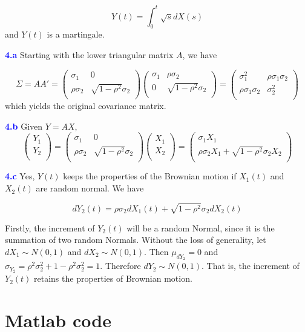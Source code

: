 \documentclass[a4paper,11pt] {article}
\begin{document}
$$
Y(t) = \int_0^t \sqrt{s}dX(s)
$$
and $Y(t)$ is a martingale.

\textcolor{blue}{\bf 4.a } Starting with the lower triangular matrix $A$, we have

$$
\Sigma = AA' =
\left(
  \begin{array}{cc}
    \sigma_1 & 0 \\
    \rho \sigma_2 & \sqrt{1-\rho^2}\sigma_2 \\
  \end{array}
\right)
\left(
  \begin{array}{cc}
    \sigma_1 & \rho \sigma_2 \\
    0 & \sqrt{1-\rho^2}\sigma_2 \\
  \end{array}
\right)
=
\left(
  \begin{array}{cc}
    \sigma_1^2 & \rho \sigma_1 \sigma_2 \\
    \rho \sigma_1 \sigma_2 & \sigma_2^2 \\
  \end{array}
\right)
$$
which yields the original covariance matrix.

\textcolor{blue}{\bf 4.b } Given $Y = AX$,
$$
\left(
  \begin{array}{c}
    Y_1 \\
    Y_2 \\
  \end{array}
\right)
=
\left(
  \begin{array}{cc}
    \sigma_1 & 0 \\
    \rho \sigma_2 & \sqrt{1-\rho^2}\sigma_2 \\
  \end{array}
\right)
\left(
  \begin{array}{c}
    X_1 \\
    X_2 \\
  \end{array}
\right)
=
\left(
  \begin{array}{c}
    \sigma_1 X_1 \\
    \rho \sigma_2 X_1 + \sqrt{1-\rho^2} \sigma_2 X_2 \\
  \end{array}
\right)
$$

\textcolor{blue}{\bf 4.c } Yes, $Y(t)$ keeps the properties of the Brownian motion if $X_1(t)$ and $X_2(t)$ are random normal. We have

$$
dY_2(t) = \rho \sigma_2 dX_1(t) + \sqrt{1-\rho^2} \sigma_2 dX_2(t)
$$

Firstly, the increment of $Y_2(t)$ will be a random Normal, since it is the summation of two random Normals. Without the loss of generality, let $dX_1 \sim N(0,1)$ and $dX_2 \sim N(0,1)$. Then $\mu_{dY_2} = 0$ and $\sigma_{Y_2} = \rho^2\sigma_2^2 + 1 - \rho^2\sigma_2^2 = 1$. Therefore $dY_2 \sim N(0,1)$. That is, the increment of $Y_2(t)$ retains the properties of Brownian motion.

\section*{Matlab code}
\begin{spacing}{0.9}

\end{spacing}
\end{document}
